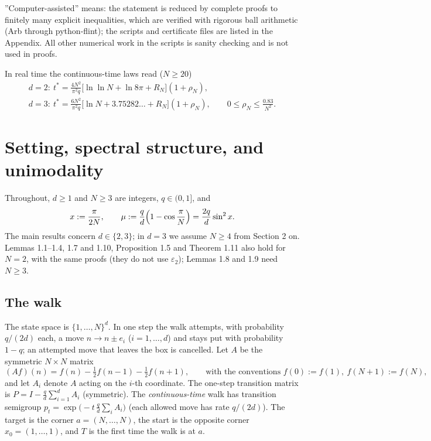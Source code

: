 \documentclass[11pt,a4paper]{article}
\theoremstyle{definition}
\theoremstyle{remark}
\begin{document}

''Computer-assisted'' means: the statement is reduced by complete proofs to finitely many explicit inequalities, which are verified with rigorous ball arithmetic (Arb through python-flint); the scripts and certificate files are listed in the Appendix. All other numerical work in the scripts is sanity checking and is not used in proofs.

In real time the continuous-time laws read ($N\ge20$)
\begin{gather*}
d=2:\ t^*=\frac{4N^2}{\pi^2q}\bigl[\ln\ln N+\ln 8\pi+R_N\bigr](1+\rho_N), \\
d=3:\ t^*=\frac{6N^2}{\pi^2q}\bigl[\ln N+3.75282\ldots+R_N\bigr](1+\rho_N), \qquad 0\le\rho_N\le\frac{0.83}{N^2}.
\end{gather*}

\setcounter{section}{0}
\section{Setting, spectral structure, and unimodality}

Throughout, $d\ge 1$ and $N\ge 3$ are integers, $q\in(0,1]$, and
\begin{equation*}
x:=\frac{\pi}{2N},\qquad \mu:=\frac{q}{d}\Bigl(1-\cos\frac{\pi}{N}\Bigr)=\frac{2q}{d}\sin^2x .
\end{equation*}
The main results concern $d\in\{2,3\}$; in $d=3$ we assume $N\ge4$ from Section 2 on. Lemmas 1.1–1.4, 1.7 and 1.10, Proposition 1.5 and Theorem 1.11 also hold for $N=2$, with the same proofs (they do not use $\varepsilon_2$); Lemmas 1.8 and 1.9 need $N\ge3$.

\subsection{The walk}

The state space is $\{1,\dots,N\}^d$. In one step the walk attempts, with probability $q/(2d)$ each, a move $n\to n\pm e_i$ ($i=1,\dots,d$) and stays put with probability $1-q$; an attempted move that leaves the box is cancelled. Let $A$ be the symmetric $N\times N$ matrix
\begin{equation*}
(Af)(n)=f(n)-\tfrac12 f(n-1)-\tfrac12 f(n+1),\qquad\text{with the conventions } f(0):=f(1),\ f(N+1):=f(N),
\end{equation*}
and let $A_i$ denote $A$ acting on the $i$-th coordinate. The one-step transition matrix is $P=I-\frac qd\sum_{i=1}^dA_i$ (symmetric). The \emph{continuous-time} walk has transition semigroup $p_t=\exp\bigl(-t\,\frac qd\sum_iA_i\bigr)$ (each allowed move has rate $q/(2d)$). The target is the corner $a=(N,\dots,N)$, the start is the opposite corner $x_0=(1,\dots,1)$, and $T$ is the first time the walk is at $a$.
\end{document}
